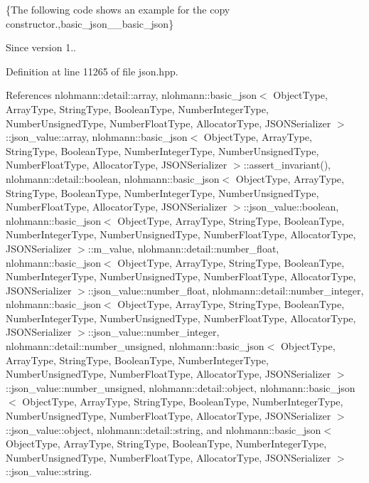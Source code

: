 \{The following code shows an example for the copy constructor.,basic\+\_\+json\+\_\+\+\_\+basic\+\_\+json\}

\begin{DoxySince}{Since}
version 1.. 
\end{DoxySince}


Definition at line 11265 of file json.\+hpp.



References nlohmann\+::detail\+::array, nlohmann\+::basic\+\_\+json$<$ Object\+Type, Array\+Type, String\+Type, Boolean\+Type, Number\+Integer\+Type, Number\+Unsigned\+Type, Number\+Float\+Type, Allocator\+Type, J\+S\+O\+N\+Serializer $>$\+::json\+\_\+value\+::array, nlohmann\+::basic\+\_\+json$<$ Object\+Type, Array\+Type, String\+Type, Boolean\+Type, Number\+Integer\+Type, Number\+Unsigned\+Type, Number\+Float\+Type, Allocator\+Type, J\+S\+O\+N\+Serializer $>$\+::assert\+\_\+invariant(), nlohmann\+::detail\+::boolean, nlohmann\+::basic\+\_\+json$<$ Object\+Type, Array\+Type, String\+Type, Boolean\+Type, Number\+Integer\+Type, Number\+Unsigned\+Type, Number\+Float\+Type, Allocator\+Type, J\+S\+O\+N\+Serializer $>$\+::json\+\_\+value\+::boolean, nlohmann\+::basic\+\_\+json$<$ Object\+Type, Array\+Type, String\+Type, Boolean\+Type, Number\+Integer\+Type, Number\+Unsigned\+Type, Number\+Float\+Type, Allocator\+Type, J\+S\+O\+N\+Serializer $>$\+::m\+\_\+value, nlohmann\+::detail\+::number\+\_\+float, nlohmann\+::basic\+\_\+json$<$ Object\+Type, Array\+Type, String\+Type, Boolean\+Type, Number\+Integer\+Type, Number\+Unsigned\+Type, Number\+Float\+Type, Allocator\+Type, J\+S\+O\+N\+Serializer $>$\+::json\+\_\+value\+::number\+\_\+float, nlohmann\+::detail\+::number\+\_\+integer, nlohmann\+::basic\+\_\+json$<$ Object\+Type, Array\+Type, String\+Type, Boolean\+Type, Number\+Integer\+Type, Number\+Unsigned\+Type, Number\+Float\+Type, Allocator\+Type, J\+S\+O\+N\+Serializer $>$\+::json\+\_\+value\+::number\+\_\+integer, nlohmann\+::detail\+::number\+\_\+unsigned, nlohmann\+::basic\+\_\+json$<$ Object\+Type, Array\+Type, String\+Type, Boolean\+Type, Number\+Integer\+Type, Number\+Unsigned\+Type, Number\+Float\+Type, Allocator\+Type, J\+S\+O\+N\+Serializer $>$\+::json\+\_\+value\+::number\+\_\+unsigned, nlohmann\+::detail\+::object, nlohmann\+::basic\+\_\+json$<$ Object\+Type, Array\+Type, String\+Type, Boolean\+Type, Number\+Integer\+Type, Number\+Unsigned\+Type, Number\+Float\+Type, Allocator\+Type, J\+S\+O\+N\+Serializer $>$\+::json\+\_\+value\+::object, nlohmann\+::detail\+::string, and nlohmann\+::basic\+\_\+json$<$ Object\+Type, Array\+Type, String\+Type, Boolean\+Type, Number\+Integer\+Type, Number\+Unsigned\+Type, Number\+Float\+Type, Allocator\+Type, J\+S\+O\+N\+Serializer $>$\+::json\+\_\+value\+::string.


